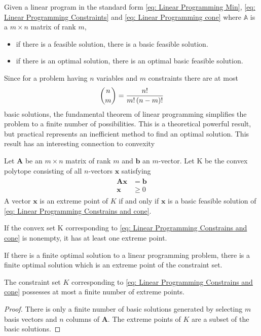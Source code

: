 \begin{theorem} Given a linear program in the standard form \eqref{eq: Linear Programming Min}, \eqref{eq: Linear Programming Constraints} and \eqref{eq: Linear Programming cone} where $\mathbb{A}$ is a $m\times n $ matrix of rank $m$,
	\begin{itemize}
		\item if there is a feasible solution, there is a basic feasible solution.
		\item if there is an optimal solution, there is an optimal basic feasible solution. 
	\end{itemize}
\end{theorem}
Since for a problem having $n$ variables and $m$ constraints there are at most
\begin{equation*}
	\binom{n}{m}=\frac{n!}{m!\left( n-m \right)!}
\end{equation*}
basic solutions, the fundamental theorem of linear programming simplifies the problem to a finite number of possibilities. This is a theoretical powerful result, but practical represents an inefficient method to find an optimal solution. This result has an interesting connection to convexity 

\begin{theorem}
	Let $\mathbf{A}$ be an $m\times n$ matrix of rank $m$ and $\mathbf{b}$ an $m$-vector. Let K be the convex polytope consisting of all $n$-vectors $\mathbf{x}$ satisfying
	\begin{align}
		\begin{array}{cc}
		\mathbf{A}\mathbf{x}&=\mathbf{b} \\
		\mathbf{x}&\geq 0		
		\end{array}
	\label{eq: Linear Programming Constrains and cone}
	\end{align}
	A vector $\mathbf{x}$ is an extreme point of $K$ if and only if $\mathbf{x}$ is a basic feasible solution of \eqref{eq: Linear Programming Constrains and cone}.
\end{theorem}
\begin{corollary}
If the convex set K corresponding to \eqref{eq: Linear Programming Constrains and cone} is nonempty, it has at least one extreme point.
\end{corollary}
\begin{corollary}
If there is a finite optimal solution to a linear programming problem, there is a finite optimal solution which is an extreme point of the constraint set.
\end{corollary}
\begin{corollary}
The constraint set $K$ corresponding to \eqref{eq: Linear Programming Constrains and cone} possesses at most a finite number of extreme points.
	\begin{proof}
	There is only a finite number of basic solutions generated by selecting $m$ basis vectors and $n$ columns of $\mathbf{A}$. The extreme points of $K$ are a subset of the basic solutions.
	\end{proof}
\end{corollary}

